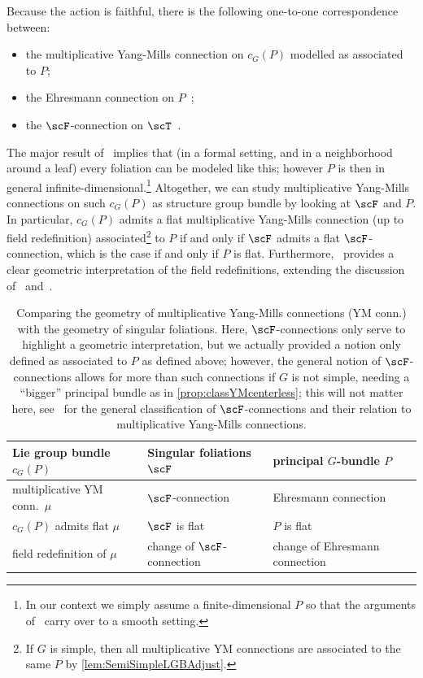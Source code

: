 \documentclass[reqno,a4paper,oneside]{amsart}
\theoremstyle{plain}
\theoremstyle{remark}
\theoremstyle{definition}
\begin{document}
    Because the action is faithful, there is the following one-to-one correspondence between:
    \begin{itemize}
        \item the multiplicative Yang-Mills connection on $c_G(P)$ modelled as associated to $P$;
        \item the Ehresmann connection on $P$~;
        \item the $\scF$-connection on $\scT$~.
    \end{itemize}
    The major result of~\cite{Fischer:2401.05966} implies that (in a formal setting, and in a neighborhood around a leaf) every foliation can be modeled like this; however $P$ is then in general infinite-dimensional.\footnote{In our context we simply assume a finite-dimensional $P$ so that the arguments of~\cite{Fischer:2401.05966} carry over to a smooth setting.} Altogether, we can study multiplicative Yang-Mills connections on such $c_G(P)$ as structure group bundle by looking at $\scF$ and $P$. In particular, $c_G(P)$ admits a flat multiplicative Yang-Mills connection (up to field redefinition) associated\footnote{If $G$ is simple, then all multiplicative YM connections are associated to the same $P$ by \ref{lem:SemiSimpleLGBAdjust}.} to $P$ if and only if $\scF$ admits a flat $\scF$-connection, which is the case if and only if $P$ is flat. Furthermore,~\cite{Fischer:2401.05966} provides a clear geometric interpretation of the field redefinitions, extending the discussion of~\cite{My1stpaper} and~\cite[\S 5.1]{MyThesis}.
    
    \begin{table}[htbp]
        \caption{Comparing the geometry of multiplicative Yang-Mills connections (YM conn.) with the geometry of singular foliations. Here, $\scF$-connections only serve to highlight a geometric interpretation, but we actually provided a notion only defined as associated to $P$ as defined above; however, the general notion of $\scF$-connections allows for more than such connections if $G$ is not simple, needing a ``bigger'' principal bundle as in \ref{prop:classYMcenterless}; this will not matter here, see~\cite{Fischer:2401.05966} for the general classification of $\scF$-connections and their relation to multiplicative Yang-Mills connections.}
        \label{tab:ComparingTheGeometryGaugeTheoryWithSingularFoliations}
        \centering
        \begin{tabular}{l|l|l}
            Lie group bundle $c_G(P)$ & Singular foliations $\scF$ & principal $G$-bundle $P$\\ \hline
            multiplicative YM conn.\ $\mu$ & $\scF$-connection & Ehresmann connection \\
            $c_G(P)$ admits flat $\mu$ & $\scF$ is flat & $P$ is flat \\
            field redefinition of $\mu$ & change of $\scF$-connection & change of Ehresmann connection
        \end{tabular}
    \end{table}
    
\end{document}
